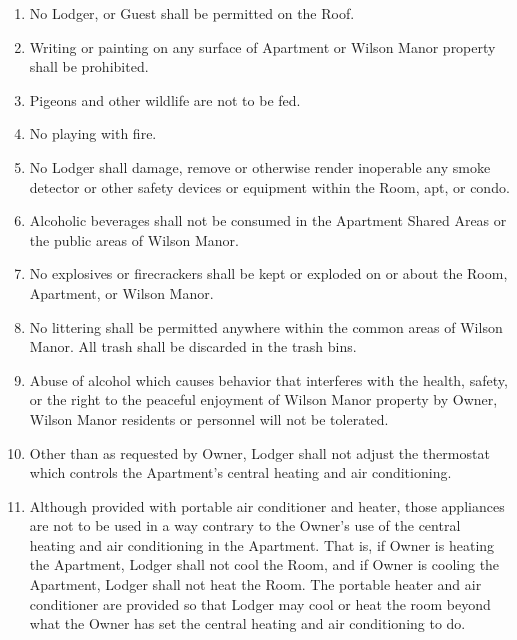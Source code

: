 \documentclass[12pt,letterpaper]{article}
\newcommand{\lodger}{Lodger}
\newcommand{\condo}{Wilson Manor}
\newcommand{\apt}{Apartment}
\newcommand{\room}{Room}
\newcommand{\shared}{Apartment Shared Areas}
\begin{document}
\begin{enumerate}
		\item	No \lodger{}, or Guest shall be permitted on the Roof. 
		\item Writing or painting on any surface of \apt{} or \condo{} property shall be prohibited. 
		\item Pigeons and other wildlife are not to be fed. 
		\item No playing with fire. 
		\item No \lodger{} shall damage, remove or otherwise render inoperable any smoke detector or other safety devices or equipment within the \room{}, apt{}, or condo{}. 
		\item Alcoholic beverages shall not be consumed in the \shared{} or the public areas of \condo{}. 
		\item No explosives or firecrackers shall be kept or exploded on or about the \room{}, \apt{}, or \condo{}. 
		\item No littering shall be permitted anywhere within the common areas of \condo{}. All trash shall be discarded in the trash bins. 
		\item Abuse of alcohol which causes behavior that interferes with the health, safety, or the right to the peaceful enjoyment of \condo{} property by Owner, \condo{} residents or personnel will not be tolerated. 
		\item Other than as requested by Owner, \lodger{} shall not adjust the thermostat which controls the \apt{}'s central heating and air conditioning.
		\item Although provided with portable air conditioner and heater, those appliances are not to be used in a way contrary to the Owner's use of the central heating and air conditioning in the \apt{}. That is, if Owner is heating the \apt{}, \lodger{} shall not cool the \room{}, and if Owner is cooling the \apt{}, \lodger{} shall not heat the \room{}. The portable heater and air conditioner are provided so that \lodger{} may cool or heat the room beyond what the Owner has set the central heating and air conditioning to do.
	\end{enumerate}
\end{document}
